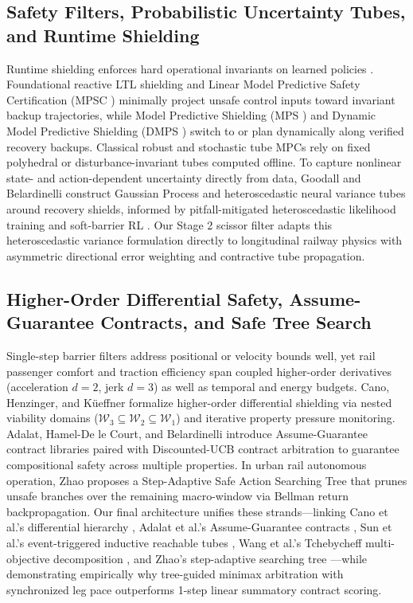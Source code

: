 \documentclass[10pt,a4paper]{article}
\begin{document}
\subsection{Safety Filters, Probabilistic Uncertainty Tubes, and Runtime Shielding}
Runtime shielding enforces hard operational invariants on learned policies \cite{ref6, ref30, ref31, ref32}. Foundational reactive LTL shielding \cite{ref30} and Linear Model Predictive Safety Certification (MPSC \cite{ref31}) minimally project unsafe control inputs toward invariant backup trajectories, while Model Predictive Shielding (MPS \cite{ref32}) and Dynamic Model Predictive Shielding (DMPS \cite{ref3}) switch to or plan dynamically along verified recovery backups. Classical robust and stochastic tube MPCs \cite{ref8, ref9} rely on fixed polyhedral or disturbance-invariant tubes computed offline. To capture nonlinear state- and action-dependent uncertainty directly from data, Goodall and Belardinelli \cite{ref4, ref5} construct Gaussian Process and heteroscedastic neural variance tubes around recovery shields, informed by pitfall-mitigated heteroscedastic likelihood training \cite{ref33} and soft-barrier RL \cite{ref7}. Our Stage 2 scissor filter adapts this heteroscedastic variance formulation directly to longitudinal railway physics with asymmetric directional error weighting and contractive tube propagation.

\subsection{Higher-Order Differential Safety, Assume-Guarantee Contracts, and Safe Tree Search}
Single-step barrier filters address positional or velocity bounds well, yet rail passenger comfort and traction efficiency span coupled higher-order derivatives (acceleration $d=2$, jerk $d=3$) as well as temporal and energy budgets. Cano, Henzinger, and K\"ueffner \cite{ref10} formalize higher-order differential shielding via nested viability domains ($\mathcal{W}_3 \subseteq \mathcal{W}_2 \subseteq \mathcal{W}_1$) and iterative property pressure monitoring. Adalat, Hamel-De le Court, and Belardinelli \cite{ref11, ref12} introduce Assume-Guarantee contract libraries paired with Discounted-UCB contract arbitration to guarantee compositional safety across multiple properties. In urban rail autonomous operation, Zhao \cite{ref22} proposes a Step-Adaptive Safe Action Searching Tree that prunes unsafe branches over the remaining macro-window via Bellman return backpropagation. Our final architecture unifies these strands—linking Cano et al.'s differential hierarchy \cite{ref10}, Adalat et al.'s Assume-Guarantee contracts \cite{ref11, ref12}, Sun et al.'s event-triggered inductive reachable tubes \cite{ref18}, Wang et al.'s Tchebycheff multi-objective decomposition \cite{ref21}, and Zhao's step-adaptive searching tree \cite{ref22}—while demonstrating empirically why tree-guided minimax arbitration with synchronized leg pace outperforms 1-step linear summatory contract scoring.
\end{document}
